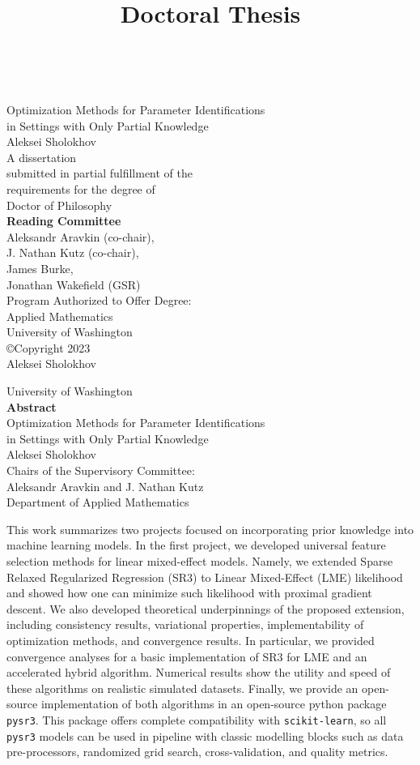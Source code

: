 \documentclass[12pt,a4paper]{book}
\newcommand{\userName}{Aleksei Sholokhov}
\newcommand{\department}{Department of Applied Mathematics}
\newcommand{\institution}{University of Washington}
\newcommand{\doctitle}{Doctoral Thesis}
\newcommand{\projectNameLong}{Optimization Methods for Parameter Identifications \\ in Settings with Only Partial Knowledge}
\numberwithin{equation}{section} %
\numberwithin{figure}{section} %
\numberwithin{table}{section} %
\begin{document}
\title{\doctitle}
~\\
{\center
{\large 
{\large
\projectNameLong
}
\\[10mm]
\userName
\\[20mm]
{A dissertation \\
 submitted in partial fulfillment of the\\ requirements for the degree of}
\\[5mm]
{Doctor of Philosophy}
\\[20mm]
{\center
\textbf{Reading Committee}\\
Aleksandr Aravkin (co-chair),\\
J. Nathan Kutz (co-chair), \\
James Burke, \\
Jonathan Wakefield (GSR)
}
\\[20mm]
Program Authorized to Offer Degree:
\\[5mm]
Applied Mathematics
\\[5mm]
\institution
}
\\[10mm]
©Copyright 2023\\
\userName

}  

\newpage
{
\center 
\institution
\\[10mm]
\textbf{Abstract}
\\[10mm]
\projectNameLong
\\[10mm]
\userName
\\[10mm]
Chairs of the Supervisory Committee:\\
Aleksandr Aravkin and J. Nathan Kutz\\
\department
\\[10mm]
}

This work summarizes two projects focused on incorporating prior knowledge into machine learning models. In the first project, we developed universal feature selection methods for linear mixed-effect models. Namely, we extended Sparse Relaxed Regularized Regression (SR3) to Linear Mixed-Effect (LME) likelihood and showed how one can minimize such likelihood with proximal gradient descent. We also developed theoretical underpinnings of the proposed extension, including consistency results, variational properties, implementability of optimization methods, and convergence results. In particular, we provided convergence analyses for a basic implementation of SR3 for LME and an accelerated hybrid algorithm. Numerical results show the utility and speed of these algorithms on realistic simulated datasets. Finally, we provide an open-source implementation of both algorithms in an open-source python package \texttt{pysr3}. This package offers complete compatibility with \texttt{scikit-learn}, so all \texttt{pysr3} models can be used in pipeline with classic modelling blocks such as data pre-processors, randomized grid search, cross-validation, and quality metrics.
\end{document}
